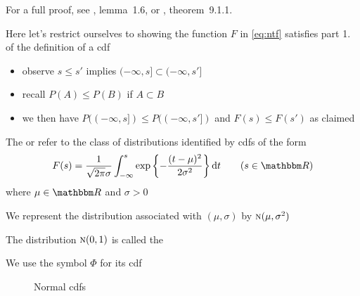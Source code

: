 \begin{frame}

    \vspace{2em}
    For a full proof, see \cite{williams1991probability}, lemma~1.6,
    or \cite{dudley2002real}, theorem~9.1.1.
    
    Here let's restrict ourselves to showing the function $F$ in
    \eqref{eq:ntf} satisfies part 1. of the definition of a {\sc cdf}
    
    \begin{itemize}
        \item observe 
    $s \leq s'$ implies $(-\infty, s] \subset (-\infty, s']$
        \item recall $P(A)\leq P(B)$ if $A\subset B$ 
        \item we then have $P((-\infty, s]) \leq P((-\infty, s'])$
        and $F(s) \leq F(s')$ as claimed
    \end{itemize}
 
\end{frame}

\begin{frame}

    \vspace{2em}
    \Eg
    The  or  refer to the class of distributions identified by {\sc
    cdf}s
    of the form
    \begin{equation*}
        F(s) =
        \frac{1}{\sqrt{2 \pi} \sigma}
        \int_{-\infty}^s
           \exp \left\{ - 
               \frac{(t - \mu)^2}{2\sigma^2} \right\} \diff t
       \qquad (s \in \RR)
    \end{equation*}
    where $\mu \in \RR$ and $\sigma > 0$
    
    We represent the distribution
    associated with $(\mu, \sigma)$ by $\textrm{\sc n}(\mu, \sigma^2)$
    
    The distribution
    $\textrm{\sc n}(0, 1)$ is called the 
    
    We use the symbol $\Phi$ for its {\sc cdf}
    
\end{frame}

\begin{frame}

    \begin{figure}
   \begin{center}
    \caption{\label{f:normal_cdfs} Normal {\sc cdf}s }
   \end{center}
    \end{figure}
    
\end{frame}


